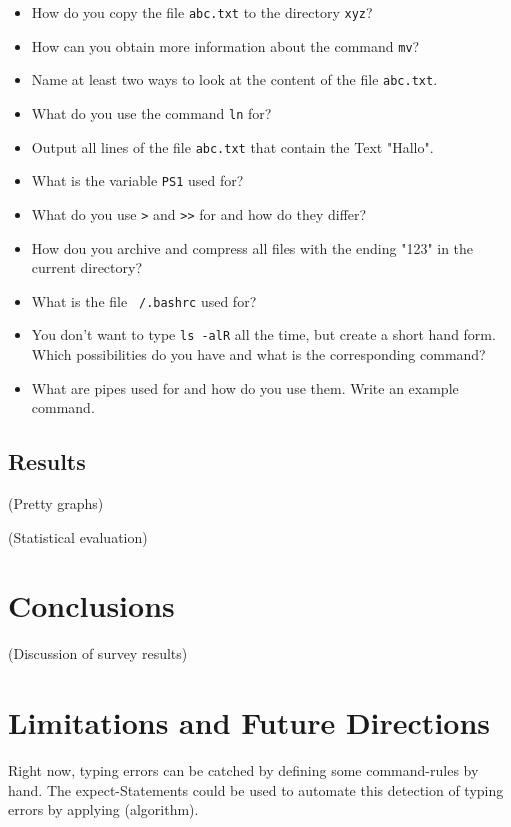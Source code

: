 \documentclass[a4paper,twoside,abstract=on,cleardoublepage=empty,numbers=noenddot,toc=bib]{scrreprt}
\begin{document}
\begin{itemize}
    \item How do you copy the file \texttt{abc.txt} to the directory \texttt{xyz}?
    \item How can you obtain more information about the command \texttt{mv}?
    \item Name at least two ways to look at the content of the file \texttt{abc.txt}.
    \item What do you use the command \texttt{ln} for?
    \item Output all lines of the file \texttt{abc.txt} that contain the Text "Hallo".
    \item What is the variable \texttt{PS1} used for?
    \item What do you use \texttt{>} and \texttt{>>} for and how do they differ?
    \item How dou you archive and compress all files with the ending "123" in the current directory?
    \item What is the file \texttt{~/.bashrc} used for?
    \item You don't want to type \texttt{ls -alR} all the time, but create a short hand form. Which possibilities do you have and what is the corresponding command?
    \item What are pipes used for and how do you use them. Write an example command.
\end{itemize}

\section{Results}

(Pretty graphs)

(Statistical evaluation)

\chapter{Conclusions}

(Discussion of survey results)

\chapter{Limitations and Future Directions}

Right now, typing errors can be catched by defining some command-rules by hand. The expect-Statements could be used to automate this detection of typing errors by applying (algorithm).
\end{document}

